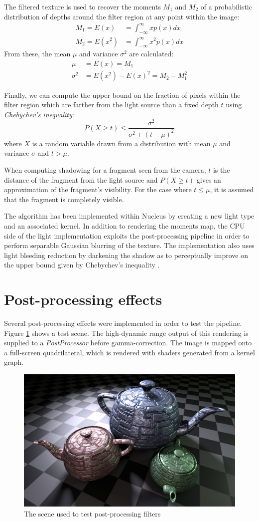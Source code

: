 The filtered texture is used to recover the moments $M_1$ and $M_2$ of a probabilistic distribution of depths around the filter region at any point within the image:
\begin{align*}
M_1 = E(x) &= \int_{-\infty}^\infty xp(x)dx \\
M_2 = E(x^2) &= \int_{-\infty}^\infty x^2p(x)dx
\end{align*}
From these, the mean $\mu$ and variance $\sigma^2$ are calculated:
\begin{align*}
\mu &= E(x) = M_1\\
\sigma^2 &= E(x^2) - E(x)^2 = M_2 - M_1^2
\end{align*}

Finally, we can compute the upper bound on the fraction of pixels within the filter region which are farther from the light source than a fixed depth $t$ using \emph{Chebychev's inequality}:
\[
P(X \geq t) \leq \frac{\sigma^2}{\sigma^2 + (t - \mu)^2}
\]
where $X$ is a random variable drawn from a distribution with mean $\mu$ and variance $\sigma$ and $t > \mu$.

When computing shadowing for a fragment seen from the camera, $t$ is the distance of the fragment from the light source and $P(X \geq t)$ gives an approximation of the fragment's visibility. For the case where $t \leq \mu$, it is assumed that the fragment is completely visible.

The algorithm has been implemented within Nucleus by creating a new light type and an associated kernel. In addition to rendering the moments map, the CPU side of the light implementation exploits the post-processing pipeline in order to perform separable Gaussian blurring of the texture. The implementation also uses light bleeding reduction by darkening the shadow as to perceptually improve on the upper bound given by Chebychev's inequality \cite{SATVSM}.

\clearpage
\section{Post-processing effects}

Several post-processing effects were implemented in order to test the pipeline. Figure \ref{fig:postProcOff} shows a test scene. The high-dynamic range output of this rendering is supplied to a \emph{PostProcessor} before gamma-correction. The image is mapped onto a full-screen quadrilateral, which is rendered with shaders generated from a kernel graph.

\begin{figure}[h!]
  \centering
  \includegraphics[width=0.45\linewidth]{./Figures/postProc/off.jpg}
  \caption[Post-processing test scene]{The scene used to test post-processing filters}
  \label{fig:postProcOff}
\end{figure}

